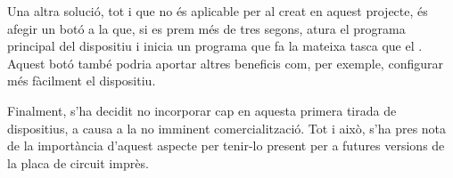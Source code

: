 Una altra solució, tot i que no és aplicable per al  creat en aquest
projecte, és afegir un botó a la  que, si es prem més de tres segons,
atura el programa principal del dispositiu i inicia un programa que
fa la mateixa tasca que el . Aquest botó també podria aportar
altres beneficis com, per exemple, configurar més fàcilment el dispositiu.

Finalment, s'ha decidit no incorporar cap  en aquesta primera
tirada de dispositius, a causa a la no imminent comercialització. Tot i això,
s'ha pres nota de la importància d'aquest aspecte per tenir-lo present per a
futures versions de la placa de circuit imprès.
